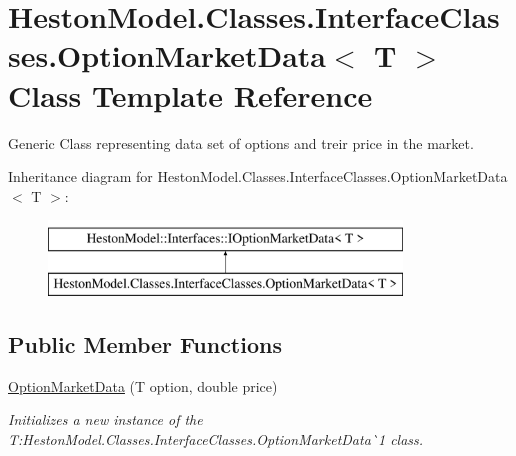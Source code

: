 \hypertarget{class_heston_model_1_1_classes_1_1_interface_classes_1_1_option_market_data}{}\section{Heston\+Model.\+Classes.\+Interface\+Classes.\+Option\+Market\+Data$<$ T $>$ Class Template Reference}
\label{class_heston_model_1_1_classes_1_1_interface_classes_1_1_option_market_data}


Generic Class representing data set of options and treir price in the market.  


Inheritance diagram for Heston\+Model.\+Classes.\+Interface\+Classes.\+Option\+Market\+Data$<$ T $>$\+:\begin{figure}[H]
\begin{center}
\leavevmode
\includegraphics[height=2.000000cm]{class_heston_model_1_1_classes_1_1_interface_classes_1_1_option_market_data}
\end{center}
\end{figure}
\subsection*{Public Member Functions}
\begin{DoxyCompactItemize}
\item 
\mbox{\hyperlink{class_heston_model_1_1_classes_1_1_interface_classes_1_1_option_market_data_a5f931cef4b3d40cdc288d2ae53d5cb6c}{Option\+Market\+Data}} (T option, double price)
\begin{DoxyCompactList}\small\item\em Initializes a new instance of the T\+:\+Heston\+Model.\+Classes.\+Interface\+Classes.\+Option\+Market\+Data\`{}1 class. \end{DoxyCompactList}\end{DoxyCompactItemize}
